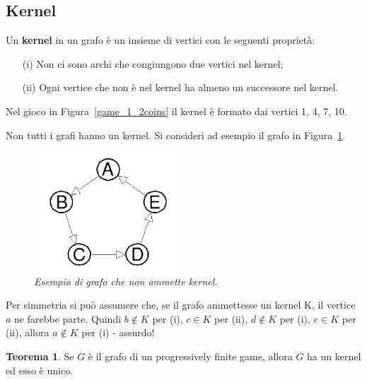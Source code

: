 \documentclass[a4paper, 10pt]{report}
\theoremstyle{definition} %
\newtheorem{theorem}{Teorema}
\begin{document}
\begin{center}
\subsection*{Kernel}
\end{center}

Un \textbf{kernel} in un grafo \`e un insieme di vertici con le seguenti 
propriet\`a:
\begin{itemize}
\item[(i)] Non ci sono archi che congiungono due vertici nel kernel;
\item[(ii)] Ogni vertice che non \`e nel kernel ha almeno un successore nel kernel.
\end{itemize}

Nel gioco in Figura~\ref{game_1_2coins} il kernel \`e formato dai vertici 1, 4, 7, 10.

Non tutti i grafi hanno un kernel. Si consideri ad esempio il grafo in Figura~\ref{no_kernel}. 

\begin{figure}[h]
  \label{no_kernel}
  \centerline{
    \includegraphics[width=0.5\textwidth]{figs/no_kernel.png}  
  }
  \caption{\textsl{Esempio di grafo che non ammette kernel.}}
\end{figure}

Per simmetria si pu\`o assumere che, se il grafo ammettesse un kernel K, il 
vertice $a$ ne farebbe parte. Quindi $b \not\in K$ per (i), $c \in K$ per (ii),
$d \not\in K$ per (i), $e \in K$ per (ii), allora $a \not\in K$ per (i)
- assurdo!
\newline

\begin{theorem}
Se $G$ \`e il grafo di un progressively finite game, allora $G$ ha
un kernel ed esso \`e unico.
\end{theorem}
\end{document}
